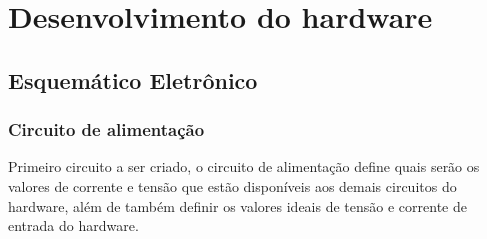 \section{Desenvolvimento do hardware}

\subsection{Esquemático Eletrônico}

\subsubsection{Circuito de alimentação}

Primeiro circuito a ser criado, o circuito de alimentação define quais serão os valores de corrente e tensão que estão disponíveis aos demais circuitos do hardware, além de também definir os valores ideais de tensão e corrente de entrada do hardware. 





